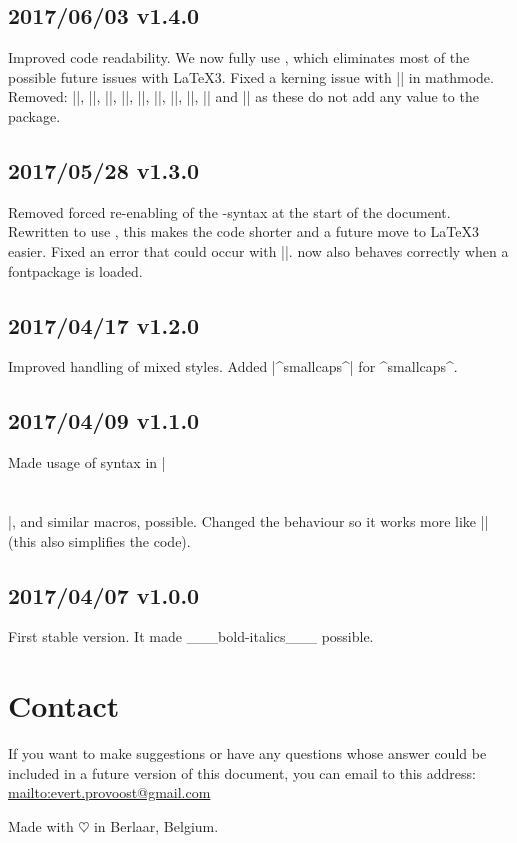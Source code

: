 \documentclass[11pt, cm-default]{l3doc}
\begin{document}
	\subsection*{2017/06/03 v1.4.0}
	Improved code readability.
	We now fully use , which eliminates most of the possible future
	issues with \LaTeX3. Fixed a kerning issue with |\cir| in mathmode. Removed:
	|\setundact|, |\setundsub|, |\setciract|, |\setcirsup|, |\nrfamily|, |\nrshape|,
	|\nrseries|, |\setffamily|, |\setfshape| and |\setfseries| as these do not add
	any value to the package.

	\subsection*{2017/05/28 v1.3.0}
	Removed forced re-enabling of the -syntax at the start of the
	document. Rewritten to use , this makes the code shorter and a future
	move to \LaTeX3 easier. Fixed an error that could occur with |\cir|.
	 now also behaves correctly when a fontpackage is loaded.

	\subsection*{2017/04/17 v1.2.0}
	Improved handling of mixed styles. Added |^smallcaps^| for ^smallcaps^.

	\subsection*{2017/04/09 v1.1.0}
	Made usage of syntax in |\section{}|, and similar macros, possible. Changed the
	behaviour so it works more like |\emph{}| (this also simplifies the code).

	\subsection*{2017/04/07 v1.0.0}
	First stable version. It made ___bold-italics___ possible.


	\section{Contact\label{contact}}
	If you want to make suggestions or have any questions whose answer could be
	included in a future version of this document, you can email to this address:
	\url{mailto:evert.provoost@gmail.com}

	\vspace*{\fill}\noindent
	Made with $\heartsuit$ in Berlaar, Belgium.
	\clearpage
\end{document}
